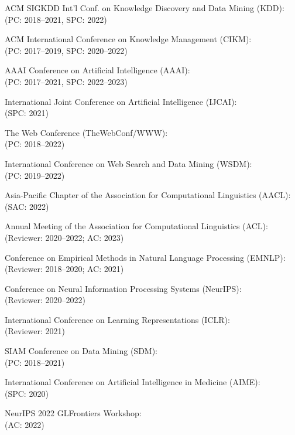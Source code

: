 \documentclass[10pt]{article}
\newenvironment{myindentpar}[1]%
{\begin{list}{}%
         {\setlength{\leftmargin}{#1}}%
         \item[]%
}
{\end{list}}
\newcounter{list}
\begin{document}
\begin{myindentpar}{0.75cm}
{}

\hspace{-0.75cm}{\bf (Senior) Program Committee / Reviewer / (Senior) Area Chair}

{\small

ACM SIGKDD Int'l Conf. on Knowledge Discovery and Data Mining (KDD): \\
(PC: 2018--2021, SPC: 2022)

ACM International Conference on Knowledge Management (CIKM): \\
(PC: 2017--2019, SPC: 2020--2022)

AAAI Conference on Artificial Intelligence (AAAI): \\
(PC: 2017--2021, SPC: 2022--2023)

International Joint Conference on Artificial Intelligence (IJCAI): \\
(SPC: 2021)

The Web Conference (TheWebConf/WWW): \\
(PC: 2018--2022)

International Conference on Web Search and Data Mining (WSDM): \\
(PC: 2019--2022)

Asia-Pacific Chapter of the Association for Computational Linguistics (AACL): \\
(SAC: 2022)

Annual Meeting of the Association for Computational Linguistics (ACL): \\
(Reviewer: 2020--2022; AC: 2023)

Conference on Empirical Methods in Natural Language Processing (EMNLP): \\
(Reviewer: 2018--2020; AC: 2021)

Conference on Neural Information Processing Systems (NeurIPS): \\
(Reviewer: 2020--2022)

International Conference on Learning Representations (ICLR): \\
(Reviewer: 2021)

SIAM Conference on Data Mining (SDM): \\
(PC: 2018--2021)

International Conference on Artificial Intelligence in Medicine (AIME): \\
(SPC: 2020)

NeurIPS 2022 GLFrontiers Workshop: \\
(AC: 2022)

}


\end{myindentpar}
\end{document}
